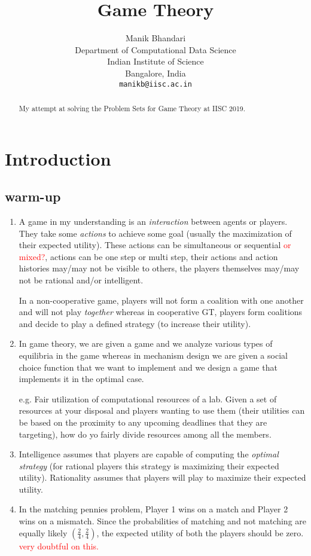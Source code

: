 \documentclass{article}
\title{Game Theory}
\author{
	Manik Bhandari\\
	Department of Computational Data Science\\
	Indian Institute of Science\\
	Bangalore, India \\
	\texttt{manikb@iisc.ac.in} \\
}
\begin{document}
	
	\maketitle
	
	\begin{abstract}
		My attempt at solving the Problem Sets for Game Theory at IISC 2019.
	\end{abstract}
	
\section{Introduction}
\subsection{warm-up}
\begin{enumerate}
	\item A game in my understanding is an \textit{interaction} between agents or players. They take some \textit{actions} to achieve some goal (usually the maximization of their expected utility). These actions can be simultaneous or sequential \textcolor{red}{or mixed?}, actions can be one step or multi step, their actions and action histories may/may not be visible to others, the players themselves may/may not be rational and/or intelligent. 
	
	In a non-cooperative game, players will not form a coalition with one another and will not play \textit{together} whereas in cooperative GT, players form coalitions and decide to play a defined strategy (to increase their utility).
	\item In game theory, we are given a game and we analyze various types of equilibria in the game whereas in mechanism design we are given a social choice function that we want to implement and we design a game that implements it in the optimal case. 
	
	e.g. Fair utilization of computational resources of a lab. Given a set of resources at your disposal and players wanting to use them (their utilities can be based on the proximity to any upcoming deadlines that they are targeting), how do yo fairly divide resources among all the members.
	\item Intelligence assumes that players are capable of computing the \textit{optimal strategy} (for rational players this strategy is maximizing their expected utility). Rationality assumes that players will play to maximize their expected utility.
	\item In the matching pennies problem, Player 1 wins on a match and Player 2 wins on a mismatch. Since the probabilities of matching and not matching are equally likely $(\frac{2}{4}, \frac{2}{4})$, the expected utility of both the players should be zero. \textcolor{red}{very doubtful on this.}
\end{enumerate}
	
	
\end{document}
